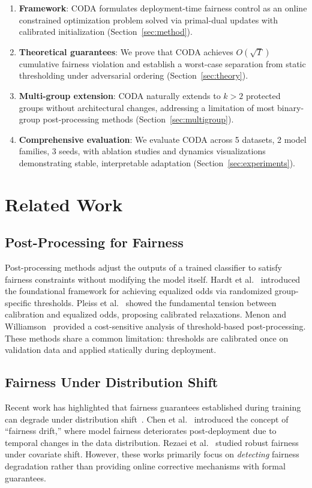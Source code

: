 \documentclass[10pt,twocolumn]{article}
\theoremstyle{definition}
\begin{document}
\begin{enumerate}
    \item \textbf{Framework}: CODA formulates deployment-time fairness control as an online constrained optimization problem solved via primal-dual updates with calibrated initialization (Section~\ref{sec:method}).
    \item \textbf{Theoretical guarantees}: We prove that CODA achieves $O(\sqrt{T})$ cumulative fairness violation and establish a worst-case separation from static thresholding under adversarial ordering (Section~\ref{sec:theory}).
    \item \textbf{Multi-group extension}: CODA naturally extends to $k > 2$ protected groups without architectural changes, addressing a limitation of most binary-group post-processing methods (Section~\ref{sec:multigroup}).
    \item \textbf{Comprehensive evaluation}: We evaluate CODA across 5 datasets, 2 model families, 3 seeds, with ablation studies and dynamics visualizations demonstrating stable, interpretable adaptation (Section~\ref{sec:experiments}).
\end{enumerate}

\section{Related Work}
\label{sec:related}

\subsection{Post-Processing for Fairness}
Post-processing methods adjust the outputs of a trained classifier to satisfy fairness constraints without modifying the model itself. Hardt et al.~\cite{hardt2016equality} introduced the foundational framework for achieving equalized odds via randomized group-specific thresholds. Pleiss et al.~\cite{pleiss2017fairness} showed the fundamental tension between calibration and equalized odds, proposing calibrated relaxations. Menon and Williamson~\cite{menon2018cost} provided a cost-sensitive analysis of threshold-based post-processing. These methods share a common limitation: thresholds are calibrated once on validation data and applied statically during deployment.

\subsection{Fairness Under Distribution Shift}
Recent work has highlighted that fairness guarantees established during training can degrade under distribution shift~\cite{singh2024fairness}. Chen et al.~\cite{chen2025fairnessdrift} introduced the concept of ``fairness drift,'' where model fairness deteriorates post-deployment due to temporal changes in the data distribution. Rezaei et al.~\cite{rezaei2021robust} studied robust fairness under covariate shift. However, these works primarily focus on \emph{detecting} fairness degradation rather than providing online corrective mechanisms with formal guarantees.
\end{document}
